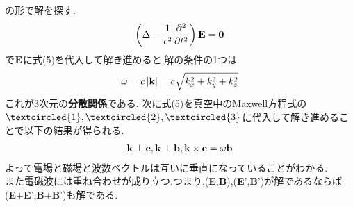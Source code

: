 \documentclass[../main]{subfiles}
\begin{document}
の形で解を探す.
\begin{eqnarray*}
\left( \Delta - \frac{1}{c^2}\frac{\partial^2}{\partial t^2} \right) {\bf E} = {\bf 0}
\end{eqnarray*}
で${\bf E}$に式(5)を代入して解き進めると,解の条件の1つは
\begin{eqnarray*}
\omega=c\left| {\bf k} \right| = c \ \sqrt[]{\mathstrut k_x^2+k_y^2+k_z^2}
\end{eqnarray*}
これが3次元の{\bf 分散関係}である.
次に式(5)を真空中のMaxwell方程式の$\textcircled{\scriptsize 1},\textcircled{\scriptsize 2},\textcircled{\scriptsize 3}$に代入して解き進めることで以下の結果が得られる.
\begin{eqnarray*}
{\bf k} \perp {\bf e}, {\bf k} \perp {\bf b},{\bf k} \times {\bf e} = \omega {\bf b}
\end{eqnarray*}
よって電場と磁場と波数ベクトルは互いに垂直になっていることがわかる. \\
また電磁波には重ね合わせが成り立つ.つまり,({\bf E},{\bf B}),({\bf E}',{\bf B}')が解であるならば({\bf E}+{\bf E}',{\bf B}+{\bf B}')も解である.
\end{document}
